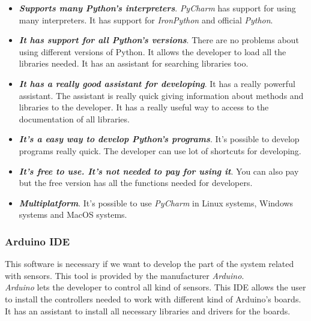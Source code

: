 \begin{itemize}

\item \textbf{\textit{Supports many Python's interpreters}}. \textit{PyCharm} has support for using many interpreters. It has support for \textit{IronPython} and official \textit{Python}.

\item \textbf{\textit{It has support for all Python's versions}}. There are no problems about using different versions of Python. It allows the developer to load all the libraries needed. It has an assistant for searching libraries too.

\item \textbf{\textit{It has a really good assistant for developing}}. It has a really powerful assistant. The assistant is really quick giving information about methods and libraries to the developer. It has a really useful way to access to the documentation of all libraries.

\item \textbf{\textit{It's a easy way to develop Python's programs}}. It's possible to develop programs really quick. The developer can use lot of shortcuts for developing.

\item \textbf{\textit{It's free to use. It's not needed to pay for using it}}. You can also pay but the free version has all the functions needed for developers.

\item \textbf{\textit{Multiplatform}}. It's possible to use \textit{PyCharm} in Linux systems, Windows systems and MacOS systems.

\end{itemize}

\subsubsection{Arduino IDE}

This software is necessary if we want to develop the part of the system related with sensors. This tool is provided by the manufacturer \textit{Arduino}.\\

\textit{Arduino} lets the developer to control all kind of sensors. This IDE allows the user to install the controllers needed to work with different kind of Arduino's boards. It has an assistant to install all necessary libraries and drivers for the boards.\\

